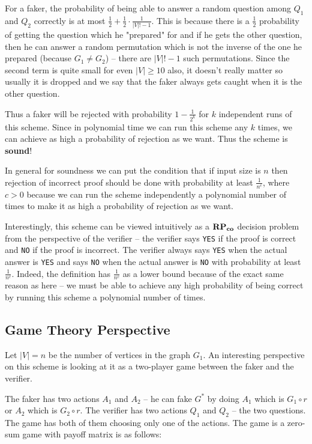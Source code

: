 For a faker, the probability of being able to answer a random question among $Q_1$ and $Q_2$ correctly is 
at most $\frac{1}{2} + \frac{1}{2} \cdot \frac{1}{|V|!-1}$. This is because there is a $\frac{1}{2}$ probability of getting 
the question which he "prepared" for and if he gets the other question, then he can answer a random permutation 
which is not the inverse of the one he prepared (because $G_1 \ne G_2$) -- there are $|V|!-1$ such permutations. Since the 
second term is quite small for even $|V| \ge 10$ also, it doesn't really matter so usually 
it is dropped and we say that the faker always gets caught when it is the other question.

Thus a faker will be rejected with probability $1-\frac{1}{2^k}$ for $k$ independent runs of 
this scheme. Since in polynomial time we can run this scheme any $k$ times, we can achieve as high a 
probability of rejection as we want. Thus the scheme is \textbf{sound}!

In general for soundness we can put the condition that if input size is $n$ then rejection of incorrect proof 
should be done with probability at least $\frac{1}{n^c}$, where $c>0$ because we can run the scheme 
independently a polynomial number of times to make it as high a probability of rejection as we want. 

Interestingly, this scheme can be viewed intuitively as a $\mathbf{RP_{co}}$ decision problem from the perspective of 
the verifier -- the verifier says \texttt{YES} if the proof is correct and \texttt{NO} if the proof is 
incorrect. The verifier always says \texttt{YES} when the actual answer is \texttt{YES} and says 
\texttt{NO} when the actual answer is \texttt{NO} with probability at least $\frac{1}{n^c}$. Indeed, 
the definition has $\frac{1}{n^c}$ as a lower bound because of the exact same reason as here -- we must be 
able to achieve any high probability of being correct by running this scheme a polynomial number of times.

\subsection{Game Theory Perspective}
Let $|V|=n$ be the number of vertices in the graph $G_1$. An interesting perspective on this scheme is 
looking at it as a two-player game between the faker and the verifier. 

The faker has two actions $A_1$ and $A_2$ -- he can fake $G^*$ by doing $A_1$ which is $G_1 \circ r$ or 
$A_2$ which is $G_2 \circ r$. The verifier has two actions $Q_1$ and $Q_2$ -- the two questions. The game 
has both of them choosing only one of the actions. The game is a zero-sum game with payoff matrix is 
as follows:

